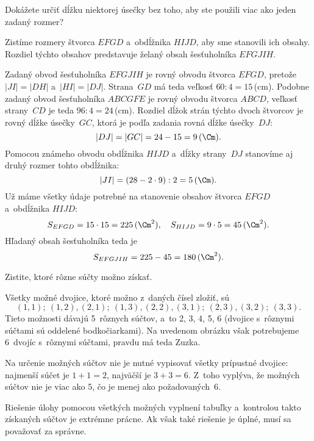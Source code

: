 {%
\napad
Dokážete určiť dĺžku niektorej úsečky bez toho, aby ste použili viac ako jeden zadaný rozmer?

\riesenie
Zistíme rozmery štvorca $EFGD$ a~obdĺžnika $HIJD$, aby sme stanovili ich obsahy.
Rozdiel týchto obsahov predstavuje želaný obsah šesťuholníka $EFGJIH$.

Zadaný obvod šesťuholníka $EFGJIH$ je rovný obvodu štvorca $EFGD$,
pretože $|JI|=|DH|$ a~$|HI|=|DJ|$.
Strana~$GD$ má teda veľkosť $60:4=15$\,(cm).
Podobne zadaný obvod šesťuholníka $ABCGFE$ je rovný obvodu štvorca $ABCD$,
veľkosť strany~$CD$ je teda $96:4=24$\,(cm).
Rozdiel dĺžok strán týchto dvoch štvorcov je rovný dĺžke úsečky~$GC$, ktorá je
podľa zadania rovná dĺžke úsečky~$DJ$:
$$
|DJ|=|GC| =24-15=9\,(\Cm).
$$
Pomocou známeho obvodu obdĺžnika $HIJD$ a~dĺžky strany~$DJ$ stanovíme
aj druhý rozmer tohto obdĺžnika:
$$
|JI|= (28-2\cdot 9):2=5\,(\Cm).
$$
Už máme všetky údaje potrebné na stanovenie obsahov štvorca $EFGD$ a~obdĺžnika $HIJD$:
$$
S_{EFGD}=15\cdot 15=225\,(\Cm^2),
\quad
S_{HIJD}=9\cdot 5=45\,(\Cm^2).
$$
Hľadaný obsah šesťuholníka teda je
$$
S_{EFGJIH}=225-45=180\,(\Cm^2).
$$
}

{%
\napad
Zistite, ktoré rôzne súčty možno získať.

\riesenie
Všetky možné dvojice, ktoré možno z~daných čísel zložiť, sú
$$
(1,1);\ (1,2), (2,1);\ (1,3), (2,2), (3,1);\ (2,3), (3,2);\ (3,3).
$$
Tieto možnosti dávajú 5~rôznych súčtov, a~to 2, 3, 4, 5, 6 (dvojice s~rôznymi
súčtami sú oddelené bodkočiarkami).
Na uvedenom obrázku však potrebujeme 6~dvojíc s~rôznymi súčtami, pravdu má
teda Zuzka.

\poznamky
Na určenie možných súčtov nie je nutné vypisovať všetky prípustné dvojice:
najmenší súčet je $1+1=2$, najväčší je $3+3=6$.
Z~toho vyplýva, že možných súčtov nie je viac ako 5, čo je menej ako
požadovaných~6.

\smallskip
Riešenie úlohy pomocou všetkých možných vyplnení tabuľky a~kontrolou takto
získaných súčtov je extrémne prácne.
Ak však také riešenie je úplné, musí sa považovať za správne.
}


